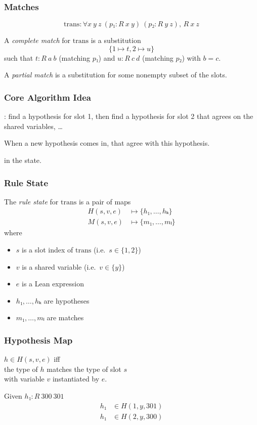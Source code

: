 \begin{frame}
  \frametitle{Matches}

  \[
    \mathrm{trans} : ∀ x~y~z~(p₁ : R~x~y)~(p₂ : R~y~z),\, R~x~z
  \]

  A \emph{complete match} for $\mathrm{trans}$ is a substitution
  \[
    \{1 ↦ t, 2 ↦ u\}
  \]
  such that $t : R~a~b$ (matching $p₁$) and $u : R~c~d$ (matching $p₂$) with $b = c$.

  \pause

  A \emph{partial match} is a substitution for some nonempty subset of the slots.
\end{frame}

\begin{frame}
  \frametitle{Core Algorithm Idea}

  : find a hypothesis for slot 1, then find a hypothesis for slot 2 that agrees on the shared variables, \dots

  When a new hypothesis comes in,  that agree with this hypothesis.

   in the state.
\end{frame}

\begin{frame}
  \frametitle{Rule State}

  The \emph{rule state} for $\mathrm{trans}$ is a pair of maps
  \begin{align*}
    H(s, v, e) &↦ \{h₁, \dots, hₖ\} \\
    M(s, v, e) &↦ \{m₁, \dots, mₗ\}
  \end{align*}
  where
  \begin{itemize}
    \item $s$ is a slot index of $\mathrm{trans}$ (i.e.\ $s ∈ \{1,2\}$)
    \item $v$ is a shared variable (i.e.\ $v ∈ \{y\}$)
    \item $e$ is a Lean expression
    \item $h₁, \dots, hₖ$ are hypotheses
    \item $m₁, \dots, mₗ$ are matches
  \end{itemize}
\end{frame}

\begin{frame}
  \frametitle{Hypothesis Map}

  $h ∈ H(s, v, e)$ iff \\
  the type of $h$ matches the type of slot $s$ \\
  with variable $v$ instantiated by $e$.

  \pause

  \begin{example}
    Given $h₁ : R~300~301$
    \begin{align*}
      h₁ &∈ H(1, y, 301) \\
      h₁ &∈ H(2, y, 300) \\
    \end{align*}
  \end{example}
\end{frame}

